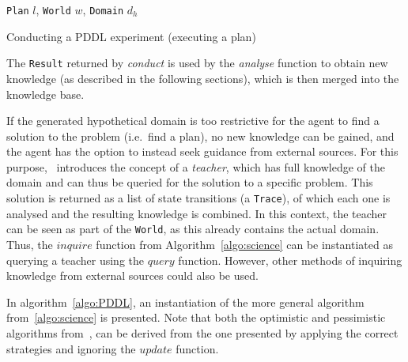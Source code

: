 \documentclass[../Master.tex]{subfiles}
\begin{document}
\begin{algorithm}
    \begin{algorithmic}
         {\texttt{Plan} $l$, \texttt{World} $w$, \texttt{Domain} $d_h$}
            \EndIf%
        \EndFor%
        \EndFunction%
    \end{algorithmic}
    \caption{Conducting a PDDL experiment (executing a plan)}\label{algo:PDDLConduct}
\end{algorithm}

The \texttt{Result} returned by \textit{conduct} is used by the \textit{analyse} function to obtain new knowledge (as described in the following sections), which is then merged into the knowledge base.

If the generated hypothetical domain is too restrictive for the agent to find a solution to the problem (i.e.\ find a plan), no new knowledge can be gained, and the agent has the option to instead seek guidance from external sources. For this purpose,~\cite{Walsh2008} introduces the concept of a \textit{teacher}, which has full knowledge of the domain and can thus be queried for the solution to a specific problem. This solution is returned as a list of state transitions (a \texttt{Trace}), of which each one is analysed and the resulting knowledge is combined. In this context, the teacher can be seen as part of the \texttt{World}, as this already contains the actual domain. Thus, the $inquire$ function from Algorithm~\ref{algo:science} can be instantiated as querying a teacher using the $query$ function. However, other methods of inquiring knowledge from external sources could also be used.

In algorithm~\ref{algo:PDDL}, an instantiation of the more general algorithm from~\ref{algo:science} is presented. Note that both the optimistic and pessimistic algorithms from~\cite{Walsh2008}, can be derived from the one presented by applying the correct strategies and ignoring the $update$ function. 

\end{document}
